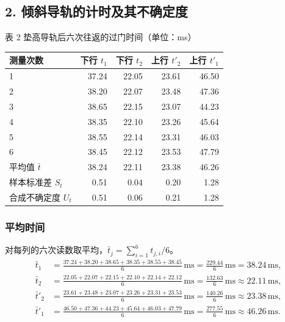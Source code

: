 \documentclass[UTF8,fontset=fandol,11pt,a4paper]{ctexart}
\newcommand{\ms}{\,\mathrm{ms}}
\begin{document}
\subsection*{2. 倾斜导轨的计时及其不确定度}
\begin{center}
表 2 \quad 垫高导轨后六次往返的过门时间（单位：ms）\\[3pt]
\begin{tabular}{lrrrr}\toprule
测量次数 & 下行 $t_1$ & 下行 $t_2$ & 上行 $t'_2$ & 上行 $t'_1$\\\midrule
1&37.24&22.05&23.61&46.50\\
2&38.20&22.07&23.48&47.36\\
3&38.65&22.15&23.07&44.23\\
4&38.35&22.10&23.26&45.64\\
5&38.55&22.14&23.31&46.03\\
6&38.45&22.12&23.53&47.79\\\midrule
平均值 $\bar t$&38.24&22.11&23.38&46.26\\
样本标准差 $S_t$&0.51&0.04&0.20&1.28\\
合成不确定度 $U_t$&0.51&0.06&0.21&1.28\\\bottomrule
\end{tabular}
\end{center}
\newpage
\subsubsection*{平均时间}
对每列的六次读数取平均，$\bar t_j=\sum_{i=1}^6 t_{j,i}/6$。
\begin{align*}
\bar t_1&=\frac{37.24+38.20+38.65+38.35+38.55+38.45}{6}\,\mathrm{ms}
=\frac{229.44}{6}\,\mathrm{ms}=38.24\ms,\\
\bar t_2&=\frac{22.05+22.07+22.15+22.10+22.14+22.12}{6}\,\mathrm{ms}
=\frac{132.63}{6}\,\mathrm{ms}\approx 22.11\ms,\\
\bar t'_2&=\frac{23.61+23.48+23.07+23.26+23.31+23.53}{6}\,\mathrm{ms}
=\frac{140.26}{6}\,\mathrm{ms}\approx 23.38\ms,\\
\bar t'_1&=\frac{46.50+47.36+44.23+45.64+46.03+47.79}{6}\,\mathrm{ms}
=\frac{277.55}{6}\,\mathrm{ms}\approx 46.26\ms .
\end{align*}
\end{document}
